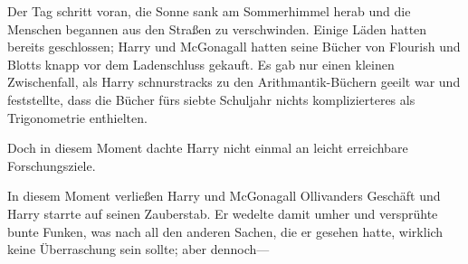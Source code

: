 Der Tag schritt voran, die Sonne sank am Sommerhimmel herab und die Menschen begannen aus den Straßen zu verschwinden. Einige Läden hatten bereits geschlossen; Harry und McGonagall hatten seine Bücher von Flourish und Blotts knapp vor dem Ladenschluss gekauft. Es gab nur einen kleinen Zwischenfall, als Harry schnurstracks zu den Arithmantik-Büchern geeilt war und feststellte, dass die Bücher fürs siebte Schuljahr nichts komplizierteres als Trigonometrie enthielten.

Doch in diesem Moment dachte Harry nicht einmal an leicht erreichbare Forschungsziele.

In diesem Moment verließen Harry und McGonagall Ollivanders Geschäft und Harry starrte auf seinen Zauberstab. Er wedelte damit umher und versprühte bunte Funken, was nach all den anderen Sachen, die er gesehen hatte, wirklich keine Überraschung sein sollte; aber dennoch—


